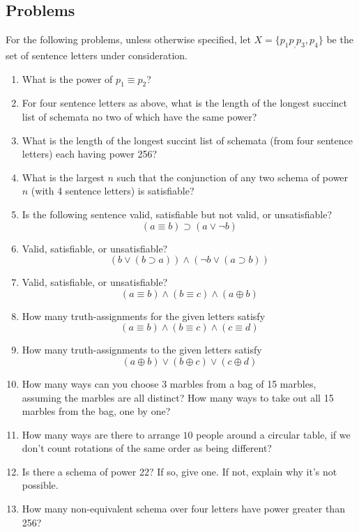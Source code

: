 \newpage
\begin{mdframed}[linewidth=1]
\section*{Problems}
For the following problems, unless otherwise specified, let $X = \{p_1 p_, p_3, p_4\}$ be the set of sentence letters under consideration. 
\begin{enumerate}
    \item What is the power of $p_1 \equiv p_2$?

    \item For four sentence letters as above, what is the length of the longest succinct list of schemata no two of which have the same power?

    \item What is the length of the longest succint list of schemata (from four sentence letters) each having power 256?

    \item What is the largest $n$ such that the conjunction of any two schema of power $n$ (with 4 sentence letters) is satisfiable?

    \item Is the following sentence valid, satisfiable but not valid, or unsatisfiable?
    \[
        (a \equiv b) \supset (a \vee \lnot b)
    \]

    \item Valid, satisfiable, or unsatisfiable?
    \[
        (b \vee (b \supset a)) \land (\lnot b \vee (a \supset b))
    \]

    \item Valid, satisfiable, or unsatisfiable?
    \[
        (a \equiv b) \land (b \equiv c) \land (a \oplus b)
    \]

    \item How many truth-assignments for the given letters satisfy 
    \[
         (a \equiv b) \land (b \equiv c) \land (c \equiv d)
     \] 

     \item How many truth-assignments to the given letters satisfy
    \[
        (a \oplus b) \vee (b \oplus c) \vee (c \oplus d)
    \]

    \item How many ways can you choose 3 marbles from a bag of 15 marbles, assuming the marbles are all distinct? How many ways to take out all 15 marbles from the bag, one by one? 

    \item How many ways are there to arrange $10$ people around a circular table, if we don't count rotations of the same order as being different?

    \item Is there a schema of power 22? If so, give one. If not, explain why it's not possible.

    \item How many non-equivalent schema over four letters have power greater than 256?
\end{enumerate}
\end{mdframed}

